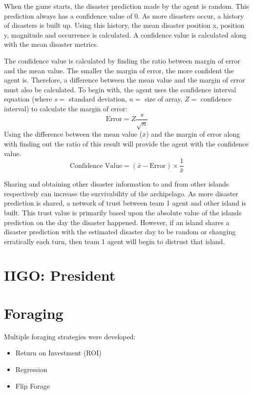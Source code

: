 When the game starts, the disaster prediction made by the agent is random. This prediction always has a confidence value of 0. As more disasters occur, a history of disasters is built up. Using this history, the mean disaster position x, position y, magnitude and occurrence is calculated. A confidence value is calculated along with the mean disaster metrics. 

The confidence value is calculated by finding the ratio between margin of error and the mean value. The smaller the margin of error, the more confident the agent is. Therefore, a difference between the mean value and the margin of error must also be calculated. To begin with, the agent uses the confidence interval equation (where $s =$ standard deviation, $n = $ size of array, $Z = $ confidence interval) to calculate the margin of error:
\begin{equation}
    \label{eq: Team1MarginOfError}
    \text{Error} = Z \dfrac{s}{\sqrt{n}} 
\end{equation}
Using the difference between the mean value ($\bar{x}$) and the margin of error along with finding out the ratio of this result will provide the agent with the confidence value.
\begin{equation}
    \text{Confidence Value} = (\bar{x} - \text{Error}) \times \dfrac{1}{\bar{x}}
\end{equation}

Sharing and obtaining other disaster information to and from other islands respectively can increase the survivability of the archipelago. As more disaster prediction is shared, a network of trust between team 1 agent and other island is built. This trust value is primarily based upon the absolute value of the islands prediction on the day the disaster happened. However, if an island shares a disaster prediction with the estimated disaster day to be random or changing erratically each turn, then team 1 agent will begin to distrust that island. 

\section{IIGO: President}

\section{Foraging}
Multiple foraging strategies were developed: 
\begin{itemize}
    \item Return on Investment (ROI)
    \item Regression
    \item Flip Forage
\end{itemize}

